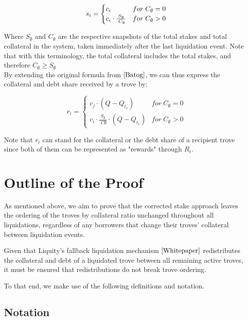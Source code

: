 \documentclass[reqno]{article}
\begin{document}
\begin{equation} \label{eq:2}
    s_i=
        \begin{cases} 
            c_i & for \;C_\emptyset = 0\\
            \mathlarger{c_i} \cdot \frac{S_\emptyset} {\;C_\emptyset} & for \;C_\emptyset>0
        \end{cases}
\end{equation}

\bigskip
Where $S_\emptyset$ and $C_\emptyset$ are the respective snapshots of the total stakes and total collateral in the system, taken immediately after the last liquidation event. Note that with this terminology, the total collateral includes the total stakes, and therefore $C_\emptyset \ge S_\emptyset$
\\

By extending the original formula from $\cite{Batog}$, we can thus express the collateral and debt share received by a trove by:

\begin{equation}
    r_i=
        \begin{cases} 
            c_j \cdot (Q - Q_{t_1}) & for \;C_\emptyset = 0\\
            c_i \cdot \frac{S_\emptyset} {\;C\emptyset} \cdot (Q - Q_{t_1}) & for \;C_\emptyset>0
        \end{cases}
\end{equation}

Note that $r_i$ can stand for the collateral or the debt share of a recipient trove since both of them can be represented as "rewards" through $R_t$.

\section{Outline of the Proof}
As mentioned above, we aim to prove that the corrected stake approach leaves the ordering of the troves by collateral ratio unchanged throughout all liquidations, regardless of any borrowers that change their troves' collateral between liquidation events.

Given that Liquity's fallback liquidation mechanism $\cite{Whitepaper}$ redistributes the collateral and debt of a liquidated trove between all remaining active troves, it must be  ensured that redistributions do not break trove ordering.

To that end, we make use of the following definitions and notation. 

\subsection{Notation}
\end{document}
